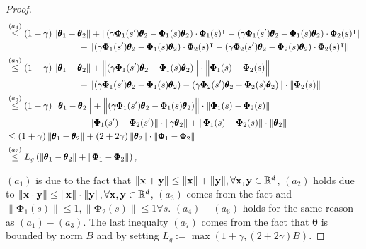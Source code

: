 \documentclass{article} %
\theoremstyle{plain}
\theoremstyle{definition}
\theoremstyle{remark}
\begin{document}
{\begin{proof}
\begin{align*}
   &\overset{(a_4)}{\leq} (1+\gamma)\left\|\pmb{\theta}_1-\pmb{\theta}_2\right\|+\left\|(\gamma \pmb{\Phi}_1(s^\prime) \pmb{\theta}_2-\pmb{\Phi}_1(s)\pmb{\theta}_2)\cdot\pmb{\Phi}_1(s)^\intercal-(\gamma \pmb{\Phi}_1(s^\prime) \pmb{\theta}_2-\pmb{\Phi}_1(s)\pmb{\theta}_2)\cdot\pmb{\Phi}_2(s)^\intercal\right\|\allowdisplaybreaks\\
   &\qquad\qquad\qquad\qquad+\left\|(\gamma \pmb{\Phi}_1(s^\prime) \pmb{\theta}_2-\pmb{\Phi}_1(s)\pmb{\theta}_2)\cdot\pmb{\Phi}_2(s)^\intercal-(\gamma \pmb{\Phi}_2(s^\prime) \pmb{\theta}_2-\pmb{\Phi}_2(s)\pmb{\theta}_2)\cdot\pmb{\Phi}_2(s)^\intercal\right\|\allowdisplaybreaks\\
   &\overset{(a_5)}{\leq} (1+\gamma)\left\|\pmb{\theta}_1-\pmb{\theta}_2\right\|+\left\|(\gamma \pmb{\Phi}_1(s^\prime) \pmb{\theta}_2-\pmb{\Phi}_1(s)\pmb{\theta}_2)\Big\|\cdot\Big\|\pmb{\Phi}_1(s)-\pmb{\Phi}_2(s)\right\|\allowdisplaybreaks\\
   &\qquad\qquad\qquad\qquad+\left\|(\gamma \pmb{\Phi}_1(s^\prime) \pmb{\theta}_2-\pmb{\Phi}_1(s)\pmb{\theta}_2)-(\gamma \pmb{\Phi}_2(s^\prime)\pmb{\theta}_2-\pmb{\Phi}_2(s)\pmb{\theta}_2)\right\|\cdot\left\|\pmb{\Phi}_2(s)\right\|\allowdisplaybreaks\\
   &\overset{(a_6)}{\leq} (1+\gamma)\left\|\pmb{\theta}_1-\pmb{\theta}_2\Big\|+\Big\|(\gamma \pmb{\Phi}_1(s^\prime) \pmb{\theta}_2-\pmb{\Phi}_1(s)\pmb{\theta}_2)\right\|\cdot\left\|\pmb{\Phi}_1(s)-\pmb{\Phi}_2(s)\right\|\allowdisplaybreaks\\
   &\qquad\qquad\qquad\qquad+\left\| \pmb{\Phi}_1(s^\prime)- \pmb{\Phi}_2(s^\prime)\right\|\cdot\left\|\gamma\pmb{\theta}_2\right\|+\left\|\pmb{\Phi}_1(s)-\pmb{\Phi}_2(s)\right\|\cdot\left\|\pmb{\theta}_2\right\|\allowdisplaybreaks\\
   &\leq (1+\gamma)\left\|\pmb{\theta}_1-\pmb{\theta}_2\right\|+(2+2\gamma)\left\|\pmb{\theta}_2\right\|\cdot\left\|\pmb{\Phi}_1-\pmb{\Phi}_2\right\|\allowdisplaybreaks\\
   &\overset{(a_7)}{\leq} L_g\left(\|\pmb{\theta}_1-\pmb{\theta}_2\|+\left\|\pmb{\Phi}_1-\pmb{\Phi}_2\right\|\right),
\end{align*}

$(a_1)$ is due to the fact that $\|{\mathbf{x}}+{\mathbf{y}}\|\leq \|{\mathbf{x}}\|+\|{\mathbf{y}}\|, \forall {\mathbf{x}},{\mathbf{y}}\in\mathbb{R}^{d}$, $(a_2)$ holds due to $\|{\mathbf{x}}\cdot{\mathbf{y}}\|\leq \|{\mathbf{x}}\|\cdot\|{\mathbf{y}}\|, \forall {\mathbf{x}},{\mathbf{y}}\in\mathbb{R}^{d}$, $(a_3)$ comes from the fact and $\|\pmb{\Phi}_1(s)\|\leq 1, \|\pmb{\Phi}_2(s)\|\leq 1 \forall s.$ 
$(a_4)-(a_6)$ holds for the same reason as $(a_1)-(a_3)$. The last inequalty $(a_7)$ comes from the fact that $\pmb{\theta}$ is bounded by norm $B$ and by setting $L_g:=\max(1+\gamma, (2+2\gamma)B)$.
\end{proof}


}
\end{document}
